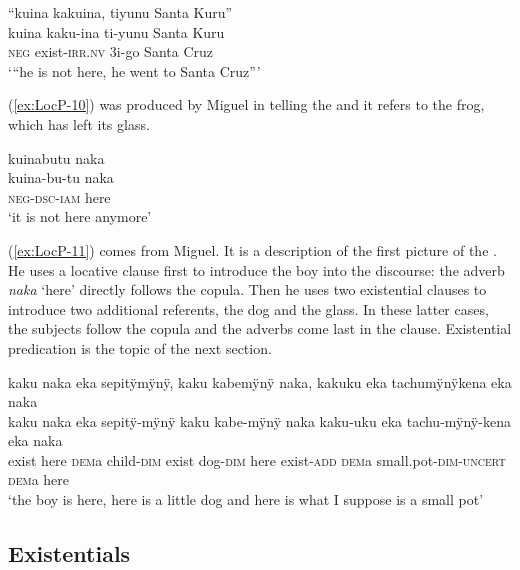 \ea\label{ex:LocP-9}
\begingl
\glpreamble “kuina kakuina, tiyunu Santa Kuru”\\
\gla kuina kaku-ina ti-yunu {Santa Kuru}\\
\glb \textsc{neg} exist-\textsc{irr.nv} 3i-go {Santa Cruz}\\
\glft ‘“he is not here, he went to Santa Cruz”'
\endgl
\trailingcitation{[jxx-e150925l-1.126]}
\xe

(\ref{ex:LocP-10}) was produced by Miguel in telling the  and it refers to the frog, which has left its glass.

\ea\label{ex:LocP-10}
\begingl
\glpreamble kuinabutu naka\\
\gla kuina-bu-tu naka\\
\glb \textsc{neg}-\textsc{dsc}-\textsc{iam} here\\
\glft ‘it is not here anymore’
\endgl
\trailingcitation{[mox-a110920l-2.039]}
\xe
{}

(\ref{ex:LocP-11}) comes from Miguel. It is a description of the first picture of the . He uses a locative clause first to introduce the boy into the discourse: the adverb \textit{naka} ‘here’ directly follows the copula.  Then he uses two existential clauses to introduce two additional referents, the dog and the glass. In these latter cases, the subjects follow the copula and the adverbs come last in the clause. Existential predication is the topic of the next section.

\ea\label{ex:LocP-11}
\begingl
\glpreamble kaku naka eka sepitÿmÿnÿ, kaku kabemÿnÿ naka, kakuku eka tachumÿnÿkena eka naka\\
\gla kaku naka eka sepitÿ-mÿnÿ kaku kabe-mÿnÿ naka kaku-uku eka tachu-mÿnÿ-kena eka naka\\
\glb exist here \textsc{dem}a child-\textsc{dim} exist dog-\textsc{dim} here exist-\textsc{add} \textsc{dem}a small.pot-\textsc{dim}-\textsc{uncert} \textsc{dem}a here\\
\glft ‘the boy is here, here is a little dog and here is what I suppose is a small pot’
\endgl
\trailingcitation{[mox-a110920l-2.006-007]}
\xe
{}

\subsection{Existentials}\label{sec:Existentials}

